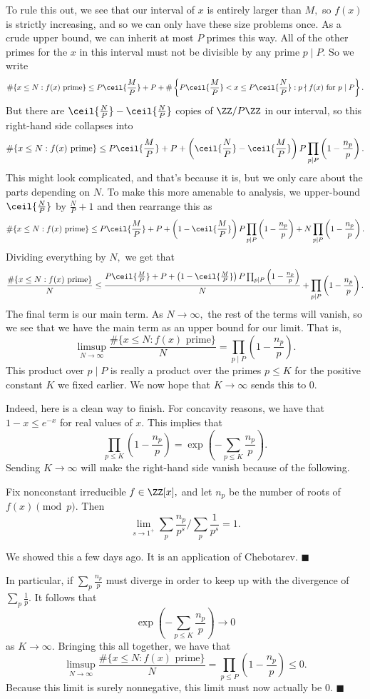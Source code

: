 To rule this out, we see that our interval of $x$ is entirely larger than $M,$ so $f(x)$ is strictly increasing, and so we can only have these size problems once. As a crude upper bound, we can inherit at most $P$ primes this way. All of the other primes for the $x$ in this interval must not be divisible by any prime $p\mid P.$ So we write
\[\#\{x\le N:f(x)\text{ prime}\}\le P\ceil{\frac MP}+P+\#\left\{P\ceil{\frac MP}<x\le P\ceil{\frac NP}:p\nmid f(x)\text{ for }p\mid P\right\}.\]
But there are $\ceil{\frac NP}-\ceil{\frac NP}$ copies of $\ZZ/P\ZZ$ in our interval, so this right-hand side collapses into
\[\#\{x\le N:f(x)\text{ prime}\}\le P\ceil{\frac MP}+P+\left(\ceil{\frac NP}-\ceil{\frac MP}\right)P\prod_{p\mid P}\left(1-\frac{n_p}p\right).\]
This might look complicated, and that's because it is, but we only care about the parts depending on $N.$ To make this more amenable to analysis, we upper-bound $\ceil{\frac NP}$ by $\frac NP+1$ and then rearrange this as
\[\#\{x\le N:f(x)\text{ prime}\}\le P\ceil{\frac MP}+P+\left(1-\ceil{\frac MP}\right)P\prod_{p\mid P}\left(1-\frac{n_p}p\right)+N\prod_{p\mid P}\left(1-\frac{n_p}p\right).\]
Dividing everything by $N,$ we get that
\[\frac{\#\{x\le N:f(x)\text{ prime}\}}N\le\frac{P\ceil{\frac MP}+P+\left(1-\ceil{\frac MP}\right)P\prod_{p\mid P}\left(1-\frac{n_p}p\right)}N+\prod_{p\mid P}\left(1-\frac{n_p}p\right).\]
The final term is our main term. As $N\to\infty,$ the rest of the terms will vanish, so we see that we have the main term as an upper bound for our limit. That is,
\[\limsup_{N\to\infty}\frac{\#\{x\le N:f(x)\text{ prime}\}}N=\prod_{p\mid P}\left(1-\frac{n_p}p\right).\]
This product over $p\mid P$ is really a product over the primes $p\le K$ for the positive constant $K$ we fixed earlier. We now hope that $K\to\infty$ sends this to $0.$

Indeed, here is a clean way to finish. For concavity reasons, we have that $1-x\le e^{-x}$ for real values of $x.$ This implies that
\[\prod_{p\le K}\left(1-\frac{n_p}p\right)=\exp\left(-\sum_{p\le K}\frac{n_p}p\right).\]
Sending $K\to\infty$ will make the right-hand side vanish because of the following.
\begin{theorem}
    Fix nonconstant irreducible $f\in\ZZ[x],$ and let $n_p$ be the number of roots of $f(x)\pmod p.$ Then
    \[\lim_{s\to1^+}\sum_p\frac{n_p}{p^s}\bigg/\sum_p\frac1{p^s}=1.\]
\end{theorem}
We showed this a few days ago. It is an application of Chebotarev. $\blacksquare$

In particular, if $\sum_p\frac{n_p}p$ must diverge in order to keep up with the divergence of $\sum_p\frac1p.$ It follows that
\[\exp\left(-\sum_{p\le K}\frac{n_p}p\right)\to0\]
as $K\to\infty.$ Bringing this all together, we have that
\[\limsup_{N\to\infty}\frac{\#\{x\le N:f(x)\text{ prime}\}}N=\prod_{p\le P}\left(1-\frac{n_p}p\right)\le0.\]
Because this limit is surely nonnegative, this limit must now actually be $0.$ $\blacksquare$


